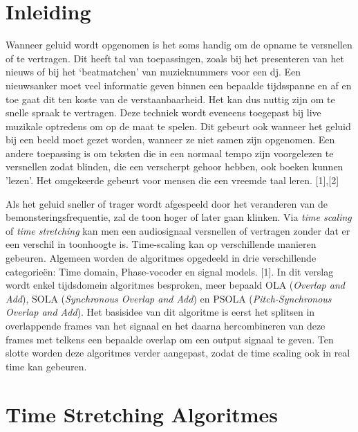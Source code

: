 \documentclass[12pt]{report}
\begin{document}
\tableofcontents

\chapter*{Inleiding}

Wanneer geluid wordt opgenomen is het soms handig om de opname te versnellen of te vertragen. Dit heeft tal van toepassingen, zoals bij het presenteren van het nieuws of bij het ‘beatmatchen’ van muzieknummers voor een dj. Een nieuwsanker moet veel informatie geven binnen een bepaalde tijdsspanne en af en toe gaat dit ten koste van de verstaanbaarheid. Het kan dus nuttig zijn om te snelle spraak te vertragen. Deze techniek wordt eveneens toegepast bij live muzikale optredens om op de maat te spelen.
Dit gebeurt ook wanneer het geluid bij een beeld moet gezet worden, wanneer ze niet samen zijn opgenomen. Een andere toepassing is om teksten die in een normaal tempo zijn voorgelezen te versnellen zodat blinden, die een verscherpt gehoor hebben, ook boeken kunnen 'lezen'. Het omgekeerde gebeurt voor mensen die een vreemde taal leren. [1],[2]

Als het geluid sneller of trager wordt afgespeeld door het veranderen van de bemonsteringsfrequentie, zal de toon hoger of later gaan klinken. Via \textit{time scaling} of \textit{time stretching} kan men een audiosignaal versnellen of vertragen zonder dat er een verschil in toonhoogte is. Time-scaling kan op verschillende manieren gebeuren. Algemeen worden de algoritmes opgedeeld in drie verschillende categorie\"{e}n: Time domain, Phase-vocoder en signal models. [1]. In dit verslag wordt enkel tijdsdomein algoritmes besproken, meer bepaald OLA (\textit{Overlap and Add}), SOLA (\textit{Synchronous Overlap and Add}) en PSOLA (\textit{Pitch-Synchronous Overlap and Add}). Het basisidee  van dit algoritme is eerst het splitsen in overlappende frames van het signaal en het daarna hercombineren van deze frames met telkens een bepaalde overlap om een output signaal te geven. Ten slotte worden deze algoritmes verder aangepast, zodat de time scaling ook in real time kan gebeuren.

\chapter*{Time Stretching Algoritmes}
\end{document}
